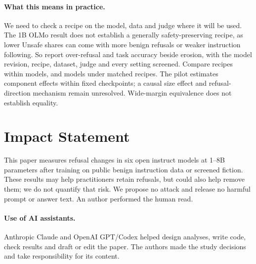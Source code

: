 \documentclass{article}
\begin{document}
\paragraph{What this means in practice.} We need to check a recipe on the
model, data and judge where it will be used. The 1B OLMo result does not
establish a generally safety-preserving recipe, as lower Unsafe shares can
come with more benign refusals or weaker instruction following. So report
over-refusal and task accuracy beside erosion, with the model revision,
recipe, dataset, judge and every setting screened. Compare recipes within
models, and models under matched recipes. The pilot estimates component
effects within fixed checkpoints; a causal size effect and refusal-direction
mechanism remain unresolved. Wide-margin equivalence does not establish equality.

\section*{Impact Statement}

This paper measures refusal changes in six open instruct models at 1--8B
parameters after training on public benign instruction data or screened
fiction. These results may help practitioners retain refusals, but could also
help remove them; we do not quantify that risk. We propose no attack and
release no harmful prompt or answer text. An author performed the human read.

\paragraph{Use of AI assistants.} Anthropic Claude and OpenAI GPT/Codex helped
design analyses, write code, check results and draft or edit the paper. The
authors made the study decisions and take responsibility for its content.




\newpage
\appendix
\onecolumn
\makeatletter
\setlength{\@fptop}{0pt}
\makeatother
\end{document}
